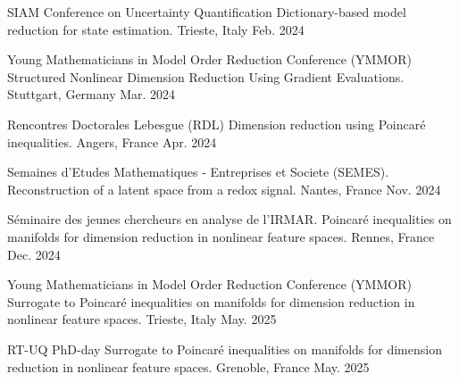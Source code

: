 \begin{cvpresentations}



\cvpresentation
{SIAM Conference on Uncertainty Quantification} %
{Dictionary-based model reduction for state estimation.} %
{Trieste, Italy} %
{Feb. 2024} %


\cvpresentation
{Young Mathematicians in Model Order Reduction Conference (YMMOR)} %
{Structured Nonlinear Dimension Reduction Using Gradient Evaluations.} %
{Stuttgart, Germany} %
{Mar. 2024} %



\cvpresentation
{Rencontres Doctorales Lebesgue (RDL)} %
{Dimension reduction using Poincaré inequalities.} %
{Angers, France} %
{Apr. 2024} %



\cvpresentation
{Semaines d'Etudes Mathematiques - Entreprises et Societe (SEMES).} %
{Reconstruction of a latent space from a redox signal.} %
{Nantes, France} %
{Nov. 2024} %


\cvpresentation
{S\'eminaire des jeunes chercheurs en analyse de l'IRMAR.} %
{Poincaré inequalities on manifolds for dimension reduction in nonlinear feature spaces.} %
{Rennes, France} %
{Dec. 2024} %


\cvpresentation
{Young Mathematicians in Model Order Reduction Conference (YMMOR)} %
{Surrogate to Poincaré inequalities on manifolds for dimension reduction in nonlinear feature spaces.} %
{Trieste, Italy} %
{May. 2025} %


\cvpresentation
{RT-UQ PhD-day} %
{Surrogate to Poincaré inequalities on manifolds for dimension reduction in nonlinear feature spaces.} %
{Grenoble, France} %
{May. 2025} %


\end{cvpresentations}
